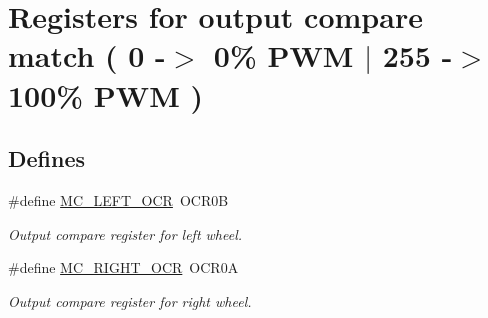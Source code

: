 \hypertarget{group___m_c___o_c_r}{\section{\-Registers for output compare match ( 0 -\/$>$ 0\% \-P\-W\-M $|$ 255 -\/$>$ 100\% \-P\-W\-M )}
\label{group___m_c___o_c_r}
}
\subsection*{\-Defines}
\begin{DoxyCompactItemize}
\item 
\hypertarget{group___m_c___o_c_r_ga1e7c75f85713ec4e9b5e1cd731b0bf87}{\#define \hyperlink{group___m_c___o_c_r_ga1e7c75f85713ec4e9b5e1cd731b0bf87}{\-M\-C\-\_\-\-L\-E\-F\-T\-\_\-\-O\-C\-R}~\-O\-C\-R0\-B}\label{group___m_c___o_c_r_ga1e7c75f85713ec4e9b5e1cd731b0bf87}

\begin{DoxyCompactList}\small\item\em \-Output compare register for left wheel. \end{DoxyCompactList}\item 
\hypertarget{group___m_c___o_c_r_gad7beaa519afc6c507ab05fa799452ed9}{\#define \hyperlink{group___m_c___o_c_r_gad7beaa519afc6c507ab05fa799452ed9}{\-M\-C\-\_\-\-R\-I\-G\-H\-T\-\_\-\-O\-C\-R}~\-O\-C\-R0\-A}\label{group___m_c___o_c_r_gad7beaa519afc6c507ab05fa799452ed9}

\begin{DoxyCompactList}\small\item\em \-Output compare register for right wheel. \end{DoxyCompactList}\end{DoxyCompactItemize}
